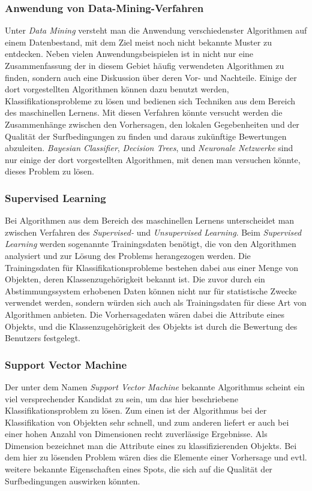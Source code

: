 \subsubsection{Anwendung von Data-Mining-Verfahren}
Unter \textit{Data Mining} versteht man die Anwendung verschiedenster
Algorithmen auf einem Datenbestand, mit dem Ziel meist noch nicht
bekannte Muster zu entdecken. Neben vielen Anwendungsbeispielen ist in
\cite{Seagaran2007} nicht nur eine Zusammenfassung der in diesem
Gebiet häufig verwendeten Algorithmen zu finden, sondern auch eine
Diskussion über deren Vor- und Nachteile. Einige der dort
vorgestellten Algorithmen können dazu benutzt werden,
Klassifikationsprobleme zu lösen und bedienen sich Techniken aus dem
Bereich des maschinellen Lernens. Mit diesen Verfahren könnte versucht
werden die Zusammenhänge zwischen den Vorhersagen, den lokalen
Gegebenheiten und der Qualität der Surfbedingungen zu finden und
daraus zukünftige Bewertungen abzuleiten. \textit{Bayesian
  Classifier}, \textit{Decision Trees}, und \textit{Neuronale
  Netzwerke} sind nur einige der dort vorgestellten Algorithmen, mit
denen man versuchen könnte, dieses Problem zu lösen.

\subsubsection{Supervised Learning}
Bei Algorithmen aus dem Bereich des maschinellen Lernens unterscheidet
man zwischen Verfahren des \textit{Supervised-} und
\textit{Unsupervised Learning}. Beim \textit{Supervised Learning}
werden sogenannte Trainingsdaten benötigt, die von den Algorithmen
analysiert und zur Lösung des Problems herangezogen werden. Die
Trainingsdaten für Klassifikationsprobleme bestehen dabei aus einer
Menge von Objekten, deren Klassenzugehörigkeit bekannt ist. Die zuvor
durch ein Abstimmungssystem erhobenen Daten können nicht nur für
statistische Zwecke verwendet werden, sondern würden sich auch als
Trainingsdaten für diese Art von Algorithmen anbieten. Die
Vorhersagedaten wären dabei die Attribute eines Objekts, und die
Klassenzugehörigkeit des Objekts ist durch die Bewertung des Benutzers
festgelegt.

\subsubsection{Support Vector Machine}
Der unter dem Namen \textit{Support Vector Machine} bekannte
Algorithmus scheint ein viel versprechender Kandidat zu sein, um das
hier beschriebene Klassifikationsproblem zu lösen. Zum einen ist der
Algorithmus bei der Klassifikation von Objekten sehr schnell, und zum
anderen liefert er auch bei einer hohen Anzahl von Dimensionen recht
zuverlässige Ergebnisse. Als Dimension bezeichnet man die Attribute
eines zu klassifizierenden Objekts. Bei dem hier zu lösenden Problem
wären dies die Elemente einer Vorhersage und evtl. weitere bekannte
Eigenschaften eines Spots, die sich auf die Qualität der
Surfbedingungen auswirken könnten.

